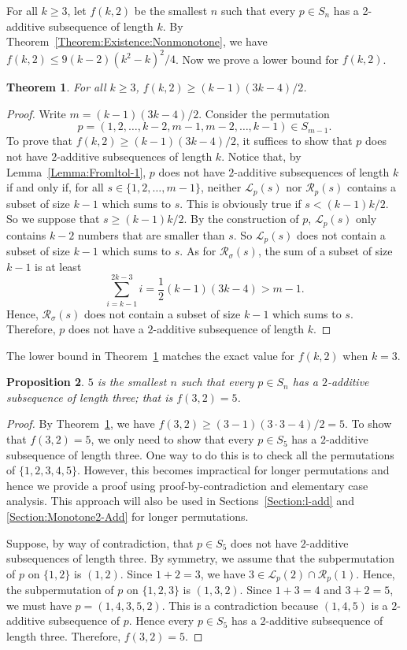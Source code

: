 \documentclass[10pt,a4paper]{amsart}
\newtheorem{theorem}{Theorem}[section]
\newtheorem{proposition}[theorem]{Proposition}
\newcommand{\cl}{\mathcal{L}}
\newcommand{\crr}{\mathcal{R}}
\begin{document}
For all $k\geq3$, let $f(k,2)$ be the smallest $n$ such that every $p\in S_n$ has a 2-additive subsequence of length $k$. By Theorem~\ref{Theorem:Existence:Nonmonotone}, we have $f(k,2)\leq9(k-2)(k^2-k)^2/4$. Now we prove a lower bound for $f(k,2)$.

\begin{theorem}\label{Theorem:NonmonotoneLower}
For all $k\geq3$, $f(k,2)\geq(k-1)(3k-4)/2$.
\end{theorem}
\begin{proof}
Write $m=(k-1)(3k-4)/2$. Consider the permutation \[p=(1,2,\ldots,k-2,m-1,m-2,\ldots,k-1)\in S_{m-1}.\] 
To prove that $f(k,2)\geq(k-1)(3k-4)/2$, it suffices to show that $p$ does not have $2$-additive subsequences of length $k$. Notice that, by Lemma~\ref{Lemma:Fromltol-1}, $p$ does not have $2$-additive subsequences of length $k$ if and only if, for all $s\in\{1,2,\ldots,m-1\}$, neither $\cl_p(s)$ nor $\crr_p(s)$ contains a subset of size $k-1$ which sums to $s$. This is obviously true if $s<(k-1)k/2$. So we suppose that $s\geq(k-1)k/2$. By the construction of $p$, $\cl_p(s)$ only contains $k-2$ numbers that are smaller than $s$. So $\cl_p(s)$ does not contain a subset of size $k-1$ which sums to $s$. As for $\crr_\sigma(s)$, the sum of a subset of size $k-1$ is at least
\[
\sum_{i=k-1}^{2k-3}i=\frac{1}{2}(k-1)(3k-4)>m-1.%
\]
Hence, $\crr_\sigma(s)$ does not contain a subset of size $k-1$ which sums to $s$. Therefore, $p$ does not have a $2$-additive subsequence of length $k$.
\end{proof}
The lower bound in Theorem~\ref{Theorem:NonmonotoneLower} matches the exact value for $f(k,2)$ when $k=3$. 

\begin{proposition}\label{Prop:Extremal2Add}
$5$ is the smallest $n$ such that every $p\in S_n$ has a $2$-additive subsequence of length three; that is $f(3,2)=5$.
\end{proposition}
\begin{proof}
    By Theorem~\ref{Theorem:NonmonotoneLower}, we have $f(3,2)\geq(3-1)(3\cdot3-4)/2=5$. To show that $f(3,2)=5$, we only need to show that every $p\in S_5$ has a $2$-additive subsequence of length three. One way to do this is to check all the permutations of $\{1,2,3,4,5\}$. However, this becomes impractical for longer permutations and hence we provide a proof using proof-by-contradiction and elementary case analysis. This approach will also be used in Sections~\ref{Section:l-add} and \ref{Section:Monotone2-Add} for longer permutations.
    
    Suppose, by way of contradiction, that $p\in S_5$ does not have $2$-additive subsequences of length three. By symmetry, we assume that the subpermutation of $p$ on $\{1,2\}$ is $(1,2)$. Since $1+2=3$, we have $3\in\mathcal{L}_p(2)\cap\mathcal{R}_p(1)$. Hence, the subpermutation of $p$ on $\{1,2,3\}$ is $(1,3,2)$. Since $1+3=4$ and $3+2=5$, we must have $p=(1,4,3,5,2)$. This is a contradiction because $(1,4,5)$ is a $2$-additive subsequence of $p$. Hence every $p\in S_5$ has a $2$-additive subsequence of length three. Therefore, $f(3,2)=5$.
\end{proof}
\end{document}
